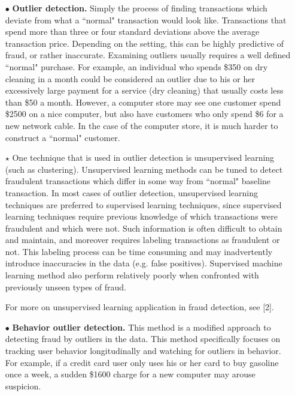 \documentclass[12pt]{article}
\begin{document}
\begin{itemize}
\item[$\bullet$] \textbf{Outlier detection.} Simply the process of finding transactions which deviate from what a ``normal" transaction would look like. Transactions that spend more than three or four standard deviations above the average transaction price. Depending on the setting, this can be highly predictive of fraud, or rather inaccurate. Examining outliers usually requires a well defined ``normal" purchase. For example, an individual who spends \$350 on dry cleaning in a month could be considered an outlier due to his or her excessively large payment for a service (dry cleaning) that usually costs less than \$50 a month. However, a computer store may see one customer spend \$2500 on a nice computer, but also have customers who only spend \$6 for a new network cable. In the case of the computer store, it is much harder to construct a ``normal" customer. 

\subitem$\star$
One technique that is used in outlier detection is unsupervised learning (such as clustering). Unsupervised learning methods can be tuned to detect fraudulent transactions which differ in some way from ``normal" baseline transaction. In most cases of outlier detection, unsupervised learning techniques are preferred to supervised learning techniques, since supervised learning techniques require previous knowledge of which transactions were fraudulent and which were not. Such information is often difficult to obtain and maintain, and moreover requires labeling transactions as fraudulent or not. This labeling process can be time consuming and may inadvertently introduce inaccuracies in the data (e.g. false positives).  Supervised machine learning method also perform relatively poorly when confronted with previously unseen types of fraud. 

For more on unsupervised learning application in fraud detection, see [2].

\item[$\bullet$]  \textbf{Behavior outlier detection.} This method is a modified approach to detecting fraud by outliers in the data. This method specifically focuses on tracking user behavior longitudinally and watching for outliers in behavior. For example, if a credit card user only uses his or her card to buy gasoline once a week, a sudden \$1600 charge for a new computer may arouse suspicion. 


\end{itemize}
\end{document}

